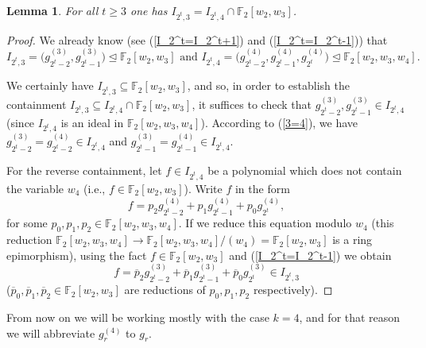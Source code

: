 \documentclass{amsart}
\newtheorem{lemma}[theorem]{Lemma}
\theoremstyle{definition}
\theoremstyle{remark}
\numberwithin{equation}{section}
\newcommand{\F}{\mathbb F}
\renewcommand{\ge}{\geqslant}
\begin{document}
\begin{lemma}\label{utapanje}
    For all $t\ge3$ one has $I_{2^t,3}=I_{2^t,4}\cap\mathbb F_2[w_2,w_3]$.
\end{lemma}
\begin{proof}
    We already know (see (\ref{I_2^t=I_2^t+1}) and (\ref{I_2^t=I_2^t-1})) that
    \[I_{2^t,3} = \big(g_{2^t-2}^{(3)},g_{2^t-1}^{(3)}\big)\trianglelefteq\mathbb F_2[w_2,w_3] \mbox{ and } I_{2^t,4} = \big(g_{2^t-2}^{(4)}, g_{2^t-1}^{(4)}, g_{2^t}^{(4)}\big)\trianglelefteq\mathbb F_2[w_2,w_3,w_4].\]
    
    We certainly have $I_{2^t,3}\subseteq\mathbb F_2[w_2,w_3]$, and so, in order to establish the containment $I_{2^t,3}\subseteq I_{2^t,4}\cap\mathbb F_2[w_2,w_3]$, it suffices to check that $g_{2^t-2}^{(3)},g_{2^t-1}^{(3)}\in I_{2^t,4}$ (since $I_{2^t,4}$ is an ideal in $\mathbb F_2[w_2,w_3,w_4]$). According to (\ref{3=4}), we have $g_{2^t-2}^{(3)} = g_{2^t-2}^{(4)}\in I_{2^t,4}$ and $g_{2^t-1}^{(3)} = g_{2^t-1}^{(4)}\in I_{2^t,4}$. 

    \medskip

    For the reverse containment, let $f\in I_{2^t,4}$ be a polynomial which does not contain the variable $w_4$ (i.e., $f\in\mathbb F_2[w_2,w_3]$). Write $f$ in the form \[f=p_2g_{2^t-2}^{(4)}+p_1g_{2^t-1}^{(4)}+p_0g_{2^t}^{(4)},\]
    for some $p_0,p_1,p_2\in\mathbb F_2[w_2,w_3,w_4]$. If we reduce this equation modulo $w_4$ (this reduction $\mathbb F_2[w_2,w_3,w_4]\rightarrow\mathbb F_2[w_2,w_3,w_4]/(w_4)=\mathbb F_2[w_2,w_3]$ is a ring epimorphism), using the fact $f\in\mathbb F_2[w_2,w_3]$ and (\ref{I_2^t=I_2^t-1}) we obtain
    \[f=\overline p_2g_{2^t-2}^{(3)}+\overline p_1g_{2^t-1}^{(3)}+\overline p_0g_{2^t}^{(3)}\in I_{2^t,3}\]
    ($\overline p_0,\overline p_1,\overline p_2\in\mathbb F_2[w_2,w_3]$ are reductions of $p_0,p_1,p_2$ respectively).
\end{proof}

From now on we will be working mostly with the case $k=4$, and for that reason we will abbreviate $g_r^{(4)}$ to $g_r$. 
\end{document}
